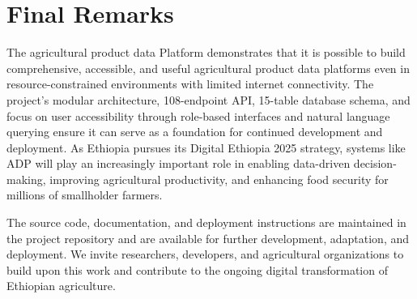 \documentclass[12pt,a4paper,oneside]{report}
\begin{document}
\section{Final Remarks}
The agricultural product data Platform demonstrates that it is possible to build comprehensive, accessible, and useful agricultural product data platforms even in resource-constrained environments with limited internet connectivity. The project's modular architecture, 108-endpoint API, 15-table database schema, and focus on user accessibility through role-based interfaces and natural language querying ensure it can serve as a foundation for continued development and deployment. As Ethiopia pursues its Digital Ethiopia 2025 strategy, systems like ADP will play an increasingly important role in enabling data-driven decision-making, improving agricultural productivity, and enhancing food security for millions of smallholder farmers.

The source code, documentation, and deployment instructions are maintained in the project repository and are available for further development, adaptation, and deployment. We invite researchers, developers, and agricultural organizations to build upon this work and contribute to the ongoing digital transformation of Ethiopian agriculture.

\renewcommand{\bibname}{References}


\end{document}
